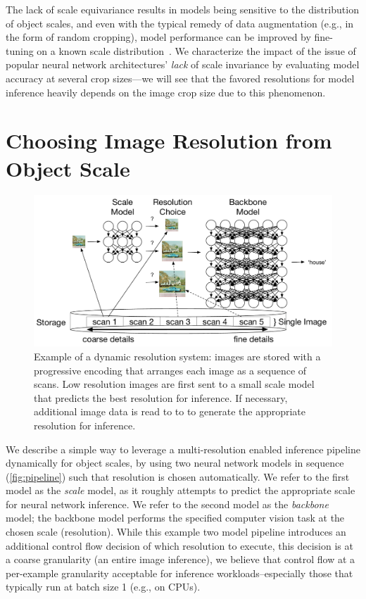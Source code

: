 The lack of scale equivariance results in models being sensitive to the distribution of object scales, and even with the typical remedy of data augmentation (e.g., in the form of random cropping), model performance can be improved by fine-tuning on a known scale distribution~\cite{touvron2019fixing}.
We characterize the impact of the issue of popular neural network architectures' \emph{lack} of scale invariance by evaluating model accuracy at several crop sizes---we will see that the favored resolutions for model inference heavily depends on the image crop size due to this phenomenon.


\section{Choosing Image Resolution from Object Scale}
\begin{figure}
    \centering
    \includegraphics[width=\textwidth]{e2e_diagrams/overview figure.pdf}
    \caption{Example of a dynamic resolution system: images are stored with a progressive encoding that arranges each image as a sequence of scans. Low resolution images are first sent to a small scale model that predicts the best resolution for inference. If necessary, additional image data is read to to to generate the appropriate resolution for inference. }
    \label{fig:pipeline}
\end{figure}
We describe a simple way to leverage a multi-resolution enabled inference pipeline dynamically for object scales, by using two neural network models in sequence (\autoref{fig:pipeline}) such that resolution is chosen automatically.
We refer to the first model as the \emph{scale} model, as it roughly attempts to predict the appropriate scale for neural network inference.
We refer to the second model as the \emph{backbone} model; the backbone model performs the specified computer vision task at the chosen scale (resolution).
While this example two model pipeline introduces an additional control flow decision of which resolution to execute, this decision is at a coarse granularity (an entire image inference), we believe that control flow at a per-example granularity acceptable for inference workloads--especially those that typically run at batch size 1 (e.g., on CPUs).


